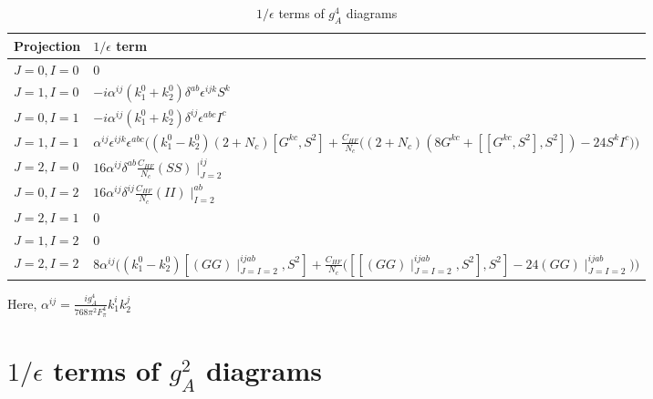 \documentclass{article}
\begin{document}
\bgroup
\def\arraystretch{2.5}%
\begin{table}
	[ht]
	\caption{$1/ \epsilon$ terms of $g_A^4$ diagrams}\label{table:gA4} 
	\begin{tabular}{ M{2.0cm} M{9cm}}
		\hline 
		Projection  & $1/ \epsilon$ term \\
		\hline 
		$J=0,I=0$ &  $ 0 $  \\ 
		$J=1,I=0$ &  $ -i  \alpha^{ij} \left(k_1^0+k_2^0\right) \delta^{ab} \epsilon^{ijk} S^k$  \\ 
		$J=0,I=1$ &  $ -i  \alpha^{ij} \left(k_1^0+k_2^0\right) \delta^{ij} \epsilon^{abc} I^c$  \\ 
		$J=1,I=1$ &  $  \alpha^{ij} \epsilon^{ijk} \epsilon^{abc} \bigg((k_1^0-k_2^0) \left(2+N_c\right) \left[G^{kc},S^2\right] +\frac{C_{HF}}{N_c} \bigg( \left(2+N_c\right) \left( 8G^{kc}+ \left[ \left[G^{kc},S^2 \right],S^2\right] \right)-24 S^kI^c \bigg)  \bigg)   $\\
		$J=2,I=0$ &  $  16 \alpha^{ij} \delta^{ab} \frac{C_{HF}}{N_c} \left(SS\right)\mid_{J=2}^{ij} $  \\ 
		$J=0,I=2$ &  $  16 \alpha^{ij} \delta^{ij} \frac{C_{HF}}{N_c} \left(II\right)\mid_{I=2}^{ab} $  \\ 
		$J=2,I=1$ &  $  0 $  \\ 
		$J=1,I=2$ &  $  0 $  \\ 
		$J=2,I=2$ &  $  8 \alpha^{ij} \bigg(  \left(k_1^0-k_2^0\right) \left[ \left(GG\right)\mid_{J=I=2}^{ijab},S^2 \right] +\frac{C_{HF}}{N_c}  \bigg( \left[\left[ \left(GG\right)\mid_{J=I=2}^{ijab},S^2 \right],S^2\right] -24\left(GG\right)\mid_{J=I=2}^{ijab}   \bigg) \bigg) $  \\ 
		\hline
	\end{tabular}
\end{table}
\egroup

Here, $\alpha^{ij} = \frac{ig_A^4}{768 \pi^2 F_\pi^4} k_1^i k_2^j $





\newpage
\section{$1/ \epsilon$ terms of $g_A^2$ diagrams}
\end{document}

